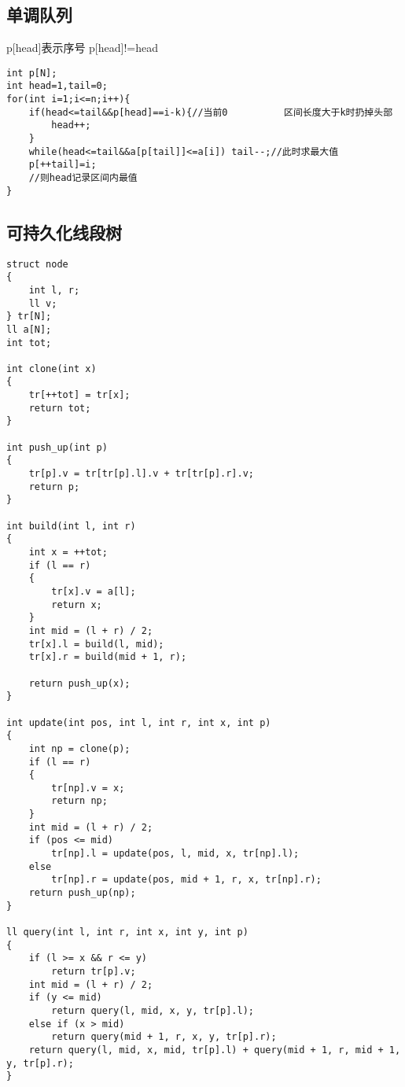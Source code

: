 \documentclass[]{article}
\begin{document}
\hypertarget{ux5355ux8c03ux961fux5217}{%
\subsection{单调队列}\label{ux5355ux8c03ux961fux5217}}

p{[}head{]}表示序号 p{[}head{]}!=head

\begin{verbatim}
int p[N];
int head=1,tail=0;
for(int i=1;i<=n;i++){
    if(head<=tail&&p[head]==i-k){//当前0          区间长度大于k时扔掉头部
        head++;
    }
    while(head<=tail&&a[p[tail]]<=a[i]) tail--;//此时求最大值
    p[++tail]=i;
    //则head记录区间内最值
}
\end{verbatim}

\hypertarget{ux53efux6301ux4e45ux5316ux7ebfux6bb5ux6811}{%
\subsection{可持久化线段树}\label{ux53efux6301ux4e45ux5316ux7ebfux6bb5ux6811}}

\begin{verbatim}
struct node
{
    int l, r;
    ll v;
} tr[N];
ll a[N];
int tot;

int clone(int x)
{
    tr[++tot] = tr[x];
    return tot;
}

int push_up(int p)
{
    tr[p].v = tr[tr[p].l].v + tr[tr[p].r].v;
    return p;
}

int build(int l, int r)
{
    int x = ++tot;
    if (l == r)
    {
        tr[x].v = a[l];
        return x;
    }
    int mid = (l + r) / 2;
    tr[x].l = build(l, mid);
    tr[x].r = build(mid + 1, r);

    return push_up(x);
}

int update(int pos, int l, int r, int x, int p)
{
    int np = clone(p);
    if (l == r)
    {
        tr[np].v = x;
        return np;
    }
    int mid = (l + r) / 2;
    if (pos <= mid)
        tr[np].l = update(pos, l, mid, x, tr[np].l);
    else
        tr[np].r = update(pos, mid + 1, r, x, tr[np].r);
    return push_up(np);
}

ll query(int l, int r, int x, int y, int p)
{
    if (l >= x && r <= y)
        return tr[p].v;
    int mid = (l + r) / 2;
    if (y <= mid)
        return query(l, mid, x, y, tr[p].l);
    else if (x > mid)
        return query(mid + 1, r, x, y, tr[p].r);
    return query(l, mid, x, mid, tr[p].l) + query(mid + 1, r, mid + 1, y, tr[p].r);
}
\end{verbatim}
\end{document}
